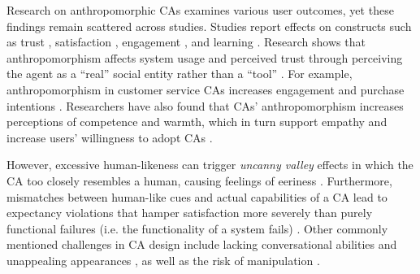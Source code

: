 \documentclass[manuscript,anonymous,sigconf]{acmart}
\begin{document}


Research on anthropomorphic CAs examines various user outcomes, yet these findings remain scattered across studies. Studies report effects on constructs such as trust \citep{nordheim2019trust}, satisfaction \citep{haugeland_understanding_2022}, engagement \citep{mehra_chatbot_2021}, and learning \citep{zheldibayeva_genai_2025}. %
Research shows that anthropomorphism affects system usage and perceived trust \citep{pfeuffer2019anthropomorphic,adam2021ai} through perceiving the agent as a ``real'' social entity rather than a ``tool'' \citep{meyer2023leverage,wang2021seeing}. For example, anthropomorphism in customer service CAs increases engagement and purchase intentions \citep{depaula2025anthropomorphism,luo2019frontiers}. Researchers have also found that CAs' anthropomorphism increases perceptions of competence and warmth, which in turn support empathy and increase users' willingness to adopt CAs \citep{kim_what_2024}.

However, excessive human-likeness can trigger \textit{uncanny valley} effects in which the CA too closely resembles a human, causing feelings of eeriness \citep{mori_bukimi_1970,soni2024chatbot}. Furthermore, mismatches between human-like cues and actual capabilities of a CA lead to expectancy violations that hamper satisfaction more severely than purely functional failures (i.e. the functionality of a system fails) \citep{ischen2024communication,qu2024chatbot}. Other commonly mentioned challenges in CA design include lacking conversational abilities and unappealing appearances \citep{diederich_design_2022}, as well as the risk of manipulation \citep{chaves2021should}.
\end{document}
